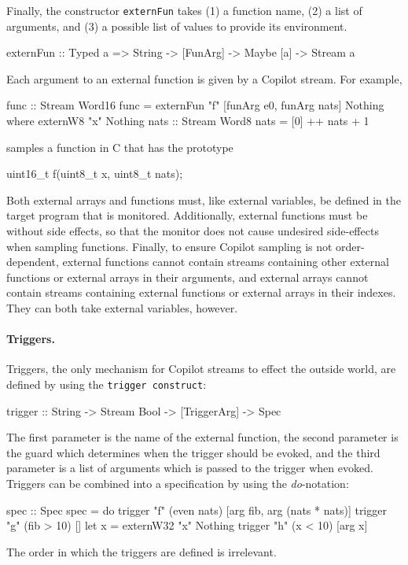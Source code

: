 \documentclass[]{article}
\theoremstyle{example}
\begin{document}
Finally, the constructor \texttt{externFun} takes (1) a function name, (2) a
list of arguments, and (3) a possible list of values to provide its environment.
%
\begin{code}
externFun :: Typed a => String -> [FunArg] 
          -> Maybe [a] -> Stream a
\end{code}
%
Each argument to an external function is given by a Copilot stream.  For
example,
%
\begin{code}
func :: Stream Word16
func = externFun "f" [funArg e0, funArg nats] Nothing
  where
  externW8 "x" Nothing
  nats :: Stream Word8
  nats = [0] ++ nats + 1
\end{code} 
samples a function in C that has the prototype
%
\begin{code}
uint16_t f(uint8_t x, uint8_t nats);
\end{code}
% 

Both external arrays and functions must, like external variables, be defined
in the target program that is monitored. Additionally, external functions must be
without side effects, so that the monitor does not cause undesired side-effects when
sampling functions.  Finally, to ensure Copilot sampling is not
order-dependent, external functions cannot contain streams containing other
external functions or external arrays in their arguments, and external arrays
cannot contain streams containing external functions or external arrays in their
indexes.  They can both take external variables, however.

\paragraph{Triggers.}
Triggers, the only mechanism for Copilot streams to effect the outside world,
are defined by using the {\tt trigger construct}:
%
\begin{code}
trigger :: String -> Stream Bool -> [TriggerArg] -> Spec
\end{code}
%
The first parameter is the name of the external function, the second parameter is the
guard which determines when the trigger should be evoked, and the third parameter
is a list of arguments which is passed to the trigger when evoked.
Triggers can be combined into a specification by using the \emph{do}-notation:
%
\begin{code}
spec :: Spec
spec = do
  trigger "f" (even nats) [arg fib, arg (nats * nats)]
  trigger "g" (fib > 10) []
  let x = externW32 "x" Nothing
  trigger "h" (x < 10) [arg x]
\end{code}
%
The order in which the triggers are defined is irrelevant.
\end{document}
